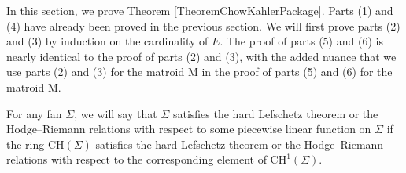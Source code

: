 \documentclass[11pt,reqno]{amsart}
\theoremstyle{definition}
\theoremstyle{remark}
\renewcommand{\(}{\left(}
\renewcommand{\)}{\right)}
\newcommand{\<}{\left<}
\renewcommand{\>}{\right>}
\begin{document}
In this section, we prove Theorem \ref{TheoremChowKahlerPackage}.
Parts (1) and (4) have already been proved in the previous section.  We will first prove parts (2) and (3) by induction on the cardinality of $E$.
The proof of parts (5) and (6) is nearly identical to the proof of parts (2) and (3), with the added nuance that 
we use parts (2) and (3) for the matroid $\mathrm{M}$ in the proof of parts (5) and (6) for the matroid $\mathrm{M}$.

For any fan $\Sigma$, we will say that $\Sigma$ satisfies the hard Lefschetz theorem or the Hodge--Riemann
relations with respect to some piecewise linear function on $\Sigma$ if the ring $\mathrm{CH}(\Sigma)$ satisfies
the hard Lefschetz theorem or the Hodge--Riemann relations with respect to the corresponding element of $\mathrm{CH}^1(\Sigma)$.
\end{document}

